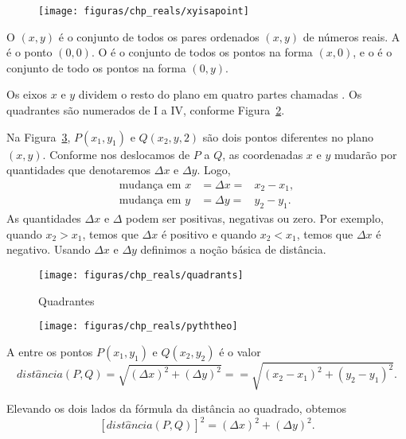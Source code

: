 \documentclass{svmono}
\begin{document}
\begin{figure}
\texttt{[image: figuras/chp\_reals/xyisapoint]}
\caption{}
\label{fig:identidadepontos}
\end{figure}

\begin{defin}
O  $(x,y)$ é o conjunto de todos os pares ordenados $(x,y)$
de números reais. A  é o ponto $(0,0)$. O 
é o conjunto de todos os pontos na forma $(x,0)$, e o  é
o conjunto de todo os pontos na forma $(0,y)$. 
\end{defin}

Os eixos $x$ e $y$ dividem o resto do plano em quatro partes chamadas
. Os quadrantes são numerados de I a IV, conforme
Figura~\ref{fig:quadrants}.

Na Figura~\ref{fig:pyththeo}, $P(x_1,y_1)$ e $Q(x_2,y,2)$ são dois
pontos diferentes no plano $(x,y)$. Conforme nos deslocamos de $P$
a $Q$, as coordenadas $x$ e $y$ mudarão por quantidades que
denotaremos $\Delta x$ e $\Delta y$. Logo,
\begin{eqnarray*}
\text{mudança em } x & = \Delta x = & x_2 - x_1, \\
\text{mudança em } y & = \Delta y = & y_2 - y_1.
\end{eqnarray*}
As quantidades $\Delta x$ e $\Delta$ podem ser positivas, negativas ou
zero. Por exemplo, quando $x_2 > x_1$, temos que $\Delta x$ é positivo
e quando $x_2 < x_1$, temos que $\Delta x$ é negativo. Usando $\Delta x$
e $\Delta y$ definimos a noção básica de distância.

\begin{figure}
\texttt{[image: figuras/chp\_reals/quadrants]}
\caption{Quadrantes}
\label{fig:quadrants}
\end{figure}

\begin{figure}
\texttt{[image: figuras/chp\_reals/pyththeo]}
\caption{}
\label{fig:pyththeo}
\end{figure}

\begin{defin}
A  entre os pontos $P(x_1,y_1)$ e $Q(x_2,y_2)$ é
o valor
\[
  dist\hat{a}ncia(P,Q) = \sqrt{(\Delta x)^2 + (\Delta y)^2} =
                       = \sqrt{(x_2 - x_1)^2 + (y_2 - y_1)^2}.
\]
\end{defin}

Elevando os dois lados da fórmula da distância ao quadrado, obtemos
\[
  [dist\hat{a}ncia(P,Q)]^2 = (\Delta x)^2 + (\Delta y)^2.
\]
\end{document}
